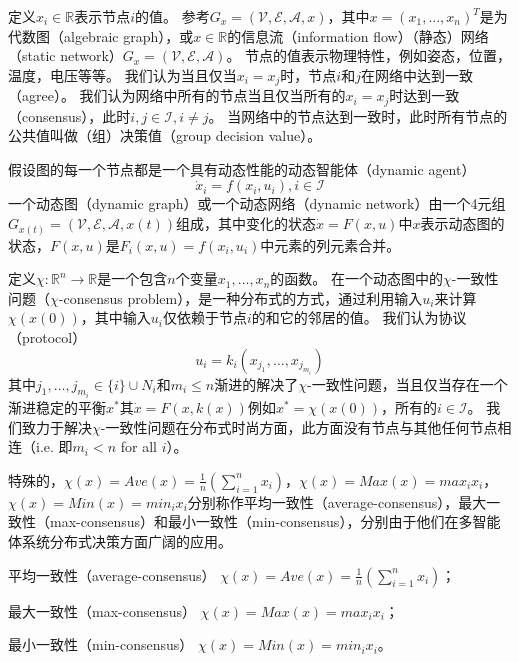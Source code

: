 \documentclass{article}
\begin{document}
定义$x_i\in \mathbb{R}$表示节点$i$的值。
参考$G_x=(\mathcal{V},\mathcal{E},\mathcal{A},x)$，其中$x=(x_1,...,x_n)^T$是为代数图（algebraic graph），或$x\in \mathbb{R}$的信息流（information flow）（静态）网络（static network）$G_x=(\mathcal{V},\mathcal{E},\mathcal{A})$。
节点的值表示物理特性，例如姿态，位置，温度，电压等等。
我们认为当且仅当$x_i=x_j$时，节点$i$和$j$在网络中达到一致（agree）。
我们认为网络中所有的节点当且仅当所有的$x_i=x_j$时达到一致（consensus），此时$i,j\in \mathcal{I}, i\ne j$。
当网络中的节点达到一致时，此时所有节点的公共值叫做（组）决策值（group decision value）。

假设图的每一个节点都是一个具有动态性能的动态智能体（dynamic agent）
\begin{equation}
    \dot{x}_i = f(x_i, u_i), i\in \mathcal{I}
    \tag{2}
    \label{2}
\end{equation}
一个动态图（dynamic graph）或一个动态网络（dynamic network）由一个4元组$G_{x(t)} = (\mathcal{V},\mathcal{E},\mathcal{A},x(t))$组成，其中变化的状态$\dot{x}=F(x,u)$中$x$表示动态图的状态，$F(x,u)$是$F_i(x,u)=f(x_i,u_i)$中元素的列元素合并。

定义$\chi: \mathbb{R}^n \rightarrow \mathbb{R}$是一个包含$n$个变量$x_1,\dots,x_n$的函数。
在一个动态图中的$\chi$-一致性问题（$\chi$-consensus problem），是一种分布式的方式，通过利用输入$u_i$来计算$\chi(x(0))$，其中输入$u_i$仅依赖于节点$i$的和它的邻居的值。
我们认为协议（protocol）
\begin{equation}
    u_i = k_i(x_{j_1},\dots,x_{j_{m_i}})
    \tag{3}
    \label{3}
\end{equation}
其中$j_1,\dots,j_{m_i}\in \{i\} \cup N_i$和$m_i\leq n$渐进的解决了$\chi$-一致性问题，当且仅当存在一个渐进稳定的平衡$x^*$其$\dot{x}=F(x,k(x))$例如$x^*=\chi(x(0))$，所有的$i\in \mathcal{I}$。
我们致力于解决$\chi$-一致性问题在分布式时尚方面，此方面没有节点与其他任何节点相连（i.e. 即$m_i < n$ for all $i$）。

特殊的，$\chi(x)=Ave(x)=\frac{1}{n}(\sum_{i=1}^{n}x_i)$，$\chi(x)=Max(x)=max_ix_i$，$\chi(x)=Min(x)=min_ix_i$分别称作平均一致性（average-consensus），最大一致性（max-consensus）和最小一致性（min-consensus），分别由于他们在多智能体系统分布式决策方面广阔的应用。

{\color{userColor}
平均一致性（average-consensus）
$\chi(x)=Ave(x)=\frac{1}{n}(\sum_{i=1}^{n}x_i)$；

最大一致性（max-consensus）
$\chi(x)=Max(x)=max_ix_i$；

最小一致性（min-consensus）
$\chi(x)=Min(x)=min_ix_i$。
}
\end{document}
